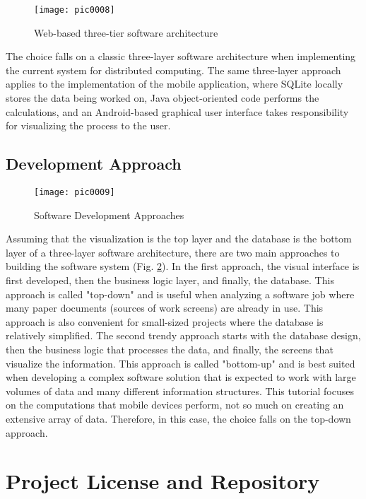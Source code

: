 \begin{figure}[h]
\centering
\texttt{[image: pic0008]}
\caption{Web-based three-tier software architecture}
\label{fig:pic0008}
\end{figure}

The choice falls on a classic three-layer software architecture when implementing the current system for distributed computing. The same three-layer approach applies to the implementation of the mobile application, where SQLite locally stores the data being worked on, Java object-oriented code performs the calculations, and an Android-based graphical user interface takes responsibility for visualizing the process to the user.

\subsection{Development Approach}

\begin{figure}[h]
\centering
\texttt{[image: pic0009]}
\caption{Software Development Approaches}
\label{fig:pic0009}
\end{figure}

Assuming that the visualization is the top layer and the database is the bottom layer of a three-layer software architecture, there are two main approaches to building the software system (Fig. \ref{fig:pic0009}). In the first approach, the visual interface is first developed, then the business logic layer, and finally, the database. This approach is called "top-down" and is useful when analyzing a software job where many paper documents (sources of work screens) are already in use. This approach is also convenient for small-sized projects where the database is relatively simplified. The second trendy approach starts with the database design, then the business logic that processes the data, and finally, the screens that visualize the information. This approach is called "bottom-up" and is best suited when developing a complex software solution that is expected to work with large volumes of data and many different information structures. This tutorial focuses on the computations that mobile devices perform, not so much on creating an extensive array of data. Therefore, in this case, the choice falls on the top-down approach.

\section{Project License and Repository}


